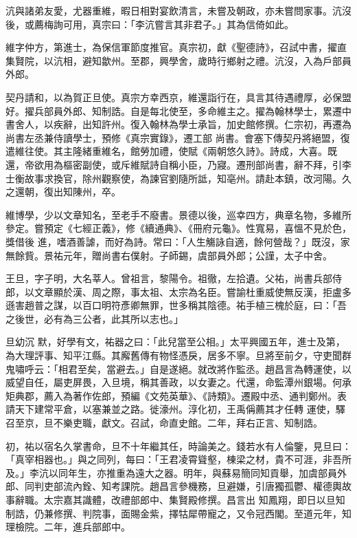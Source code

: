 \begin{pinyinscope}
 沆與諸弟友愛，尤器重維，暇日相對宴飲清言，未嘗及朝政，亦未嘗問家事。沆沒後，或薦梅詢可用，真宗曰：「李沆嘗言其非君子。」其為信倚如此。



 維字仲方，第進士，為保信軍節度推官。真宗初，獻《聖德詩》，召試中書，擢直集賢院，以沆相，避知歙州。至郡，興學舍，歲時行鄉射之禮。沆沒，入為戶部員外郎。



 契丹請和，以為賀正旦使。真宗方幸西京，維還詣行在，具言其待遇禮厚，必保盟好。擢兵部員外郎、知制誥。自是每北使至，多命維主之。擢為翰林學士，累遷中書舍人，以疾辭，出知許州。復入翰林為學士承旨，加史館修撰。仁宗初，再遷為尚書左丞兼侍讀學士，預修《真宗實錄》，遷工部
 尚書。會塞下傳契丹將絕盟，復遣維往使。其主隆緒重維名，館勞加禮，使賦《兩朝悠久詩》。詩成，大喜。既還，帝欲用為樞密副使，或斥維賦詩自稱小臣，乃寢。遷刑部尚書，辭不拜，引李士衡故事求換官，除州觀察使，為諫官劉隨所詆，知亳州。請赴本鎮，改河陽。久之還朝，復出知陳州，卒。



 維博學，少以文章知名，至老手不廢書。景德以後，巡幸四方，典章名物，多維所參定。嘗預定《七經正義》，修《續通典》、《冊府元龜》。性寬易，喜慍不見於色，獎借後
 進，嗜酒善謔，而好為詩。常曰：「人生觴詠自適，餘何營哉？」既沒，家無餘貲。景祐元年，贈尚書右僕射。子師錫，虞部員外郎；公謹，太子中舍。



 王旦，字子明，大名莘人。曾祖言，黎陽令。祖徹，左拾遺。父祐，尚書兵部侍郎，以文章顯於漢、周之際，事太祖、太宗為名臣。嘗諭杜重威使無反漢，拒盧多遜害趙普之謀，以百口明符彥卿無罪，世多稱其陰德。祐手植三槐於庭，曰：「吾之後世，必有為三公者，此其所以志也。」



 旦幼沉
 默，好學有文，祐器之曰：「此兒當至公相。」太平興國五年，進士及第，為大理評事、知平江縣。其廨舊傳有物怪憑戾，居多不寧。旦將至前夕，守吏聞群鬼嘯呼云：「相君至矣，當避去。」自是遂絕。就改將作監丞。趙昌言為轉運使，以威望自任，屬吏屏畏，入旦境，稱其善政，以女妻之。代還，命監潭州銀場。何承矩典郡，薦入為著作佐郎，預編《文苑英華》、《詩類》。遷殿中丞、通判鄭州。表請天下建常平倉，以塞兼並之路。徙濠州。淳化初，王禹偁薦其才任轉
 運使，驛召至京，旦不樂吏職，獻文。召試，命直史館。二年，拜右正言、知制誥。



 初，祐以宿名久掌書命，旦不十年繼其任，時論美之。錢若水有人倫鑒，見旦曰：「真宰相器也。」與之同列，每曰：「王君凌霄聳壑，棟梁之材，貴不可涯，非吾所及。」李沆以同年生，亦推重為遠大之器。明年，與蘇易簡同知貢舉，加虞部員外郎、同判吏部流內銓、知考課院。趙昌言參機務，旦避嫌，引唐獨孤鬱、權德輿故事辭職。太宗嘉其識體，改禮部郎中、集賢殿修撰。昌言出
 知鳳翔，即日以旦知制誥，仍兼修撰、判院事，面賜金紫，擇牯犀帶寵之，又令冠西閣。至道元年，知理檢院。二年，進兵部郎中。




\end{pinyinscope}

